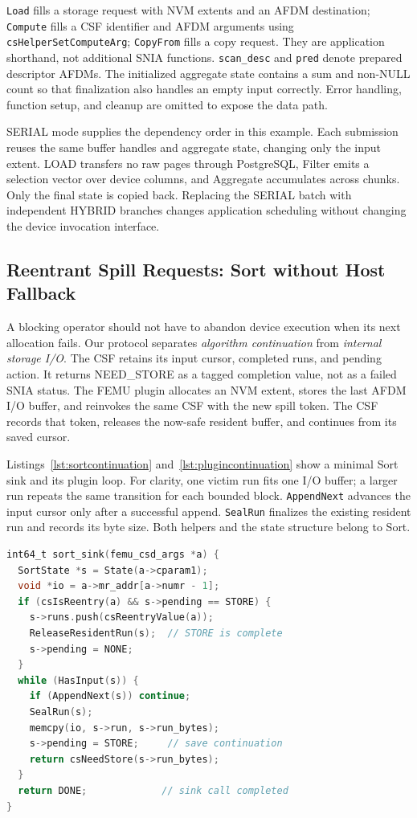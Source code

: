 \documentclass[sigconf, nonacm]{acmart}
\begin{document}
\texttt{Load} fills a storage request with NVM extents and an AFDM destination;
\texttt{Compute} fills a CSF identifier and AFDM arguments using
\texttt{csHelperSetComputeArg}; \texttt{CopyFrom} fills a copy request.
They are application shorthand, not additional SNIA functions.
\texttt{scan\_desc} and \texttt{pred} denote prepared descriptor AFDMs.
The initialized aggregate state contains a sum and non-NULL count so that
finalization also handles an empty input correctly. Error handling, function
setup, and cleanup are omitted to expose the data path.

SERIAL mode supplies the dependency order in this example. Each submission
reuses the same buffer handles and aggregate state, changing only the input
extent. LOAD transfers no raw pages through PostgreSQL, Filter emits a
selection vector over device columns, and Aggregate accumulates across
chunks. Only the final state is copied back. Replacing the SERIAL batch
with independent HYBRID branches changes application scheduling without
changing the device invocation interface.

\subsection{Reentrant Spill Requests: Sort without Host Fallback}
\label{sec:reentrant}
A blocking operator should not have to abandon device execution when its
next allocation fails. Our protocol separates \emph{algorithm continuation}
from \emph{internal storage I/O}. The CSF retains its input cursor, completed
runs, and pending action. It returns NEED\_STORE as a tagged completion value,
not as a failed SNIA status. The FEMU plugin allocates an NVM extent, stores
the last AFDM I/O buffer, and reinvokes the same CSF with the new spill token.
The CSF records that token, releases the now-safe resident buffer, and
continues from its saved cursor.

Listings~\ref{lst:sortcontinuation} and~\ref{lst:plugincontinuation} show a
minimal Sort sink and its plugin loop. For clarity, one victim run fits one
I/O buffer; a larger run repeats the same transition for each bounded block.
\texttt{AppendNext} advances the input cursor only after a successful append.
\texttt{SealRun} finalizes the existing resident run and records its byte size.
Both helpers and the state structure belong to Sort.

\begin{lstlisting}[style=demo,language=C,caption={Device Sort sink: keep the cursor and request a spill instead of returning intermediate rows.},label={lst:sortcontinuation}]
int64_t sort_sink(femu_csd_args *a) {
  SortState *s = State(a->cparam1);
  void *io = a->mr_addr[a->numr - 1];
  if (csIsReentry(a) && s->pending == STORE) {
    s->runs.push(csReentryValue(a));
    ReleaseResidentRun(s);  // STORE is complete
    s->pending = NONE;
  }
  while (HasInput(s)) {
    if (AppendNext(s)) continue;
    SealRun(s);
    memcpy(io, s->run, s->run_bytes);
    s->pending = STORE;     // save continuation
    return csNeedStore(s->run_bytes);
  }
  return DONE;             // sink call completed
}
\end{lstlisting}
\end{document}
